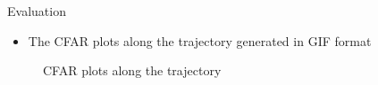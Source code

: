 \documentclass{beamer}
\begin{document}




\begin{frame}[t]{Evaluation}
	\begin{itemize}
	    \item The CFAR plots along the trajectory generated in GIF format
        \vspace{0.5\baselineskip}
	\end{itemize}
    \centering
    \begin{figure}
        \centering
        \caption{CFAR plots along the trajectory}
    \end{figure}
\end{frame}
\end{document}
